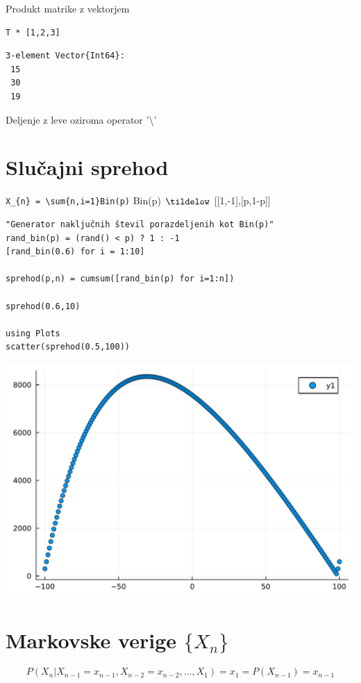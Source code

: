 \documentclass[12pt,a4paper]{article}
\begin{document}
Produkt matrike  z vektorjem 


\begin{verbatim}
T * [1,2,3]
\end{verbatim}
\begin{verbatim}
3-element Vector{Int64}:
 15
 30
 19
\end{verbatim}

Deljenje z leve oziroma operator '{\textbackslash}'


\section{Slučajni sprehod}
\texttt{X\_\{n\} = {\textbackslash}sum\{n,i=1\}Bin(p)} Bin(p) \ensuremath{\tildelow} [[1,-1],[p,1-p]]


\begin{verbatim}
"Generator naključnih števil porazdeljenih kot Bin(p)"
rand_bin(p) = (rand() < p) ? 1 : -1
[rand_bin(0.6) for i = 1:10]

sprehod(p,n) = cumsum([rand_bin(p) for i=1:n])

sprehod(0.6,10)

using Plots
scatter(sprehod(0.5,100))
\end{verbatim}
\includegraphics[width=\linewidth]{jl_KF4mRK/demo_9_1.pdf}

\section{Markovske verige $\{X_{n}\}$}
\[
P(X_{n}|X_{n-1}=x_{n-1},X_{n-2}=x_{n-2},...,X_{1}) = x_{1} = P(X_{n-1}) = x_{n-1}
\]
\end{document}
